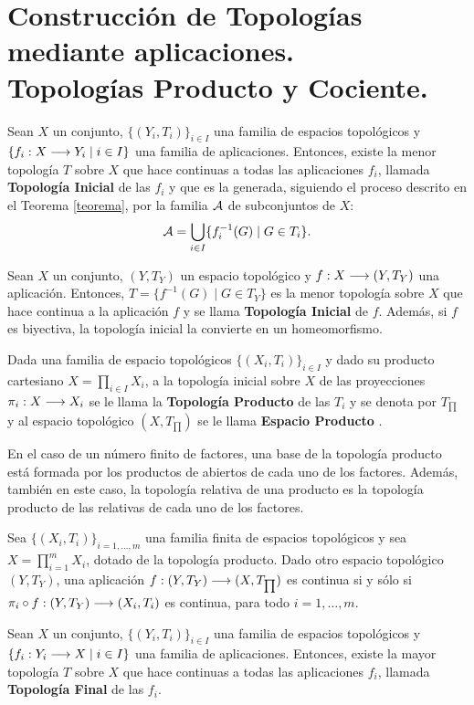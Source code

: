 \documentclass[cursovd_portada.tex]{subfiles}
\begin{document}
\section{Construcción de Topologías mediante aplicaciones.\\ Topologías Producto y Cociente.}
\begin{prop}
Sean $X$ un conjunto, $\{(Y_i,T_i)\}_{i\in I}$ una familia de espacios topológicos y $\{f_i:X\longrightarrow Y_i\mid i\in I\}$ una
familia de aplicaciones. Entonces, existe la menor topología $T$ sobre $X$ que hace continuas a todas las
aplicaciones $f_i$, llamada {\bf Topología Inicial} de las $f_i$ y que es la generada, siguiendo el proceso
descrito en el Teorema \ref{teorema}, por la familia ${\cal A}$ de subconjuntos de $X$:
$${\cal A}=\bigcup_{i\in I}\{f_i^{-1}(G)\mid G\in T_i\}.$$
\end{prop}
\begin{coro}
Sean $X$ un conjunto, $(Y,T_Y)$ un espacio topológico y $f:X\longrightarrow (Y,T_Y)$ una aplicación. Entonces,
$T=\{f^{-1}(G)\mid G\in T_Y\}$ es la menor topología sobre $X$ que hace continua a la aplicación $f$ y se llama {\bf
Topología Inicial} de $f$. Además, si $f$ es biyectiva, la topología inicial la convierte en un homeomorfismo.
\end{coro}
\begin{defi}
Dada una familia de espacio topológicos $\{(X_i,T_i)\}_{i\in I}$ y dado su producto cartesiano $X=\prod_{i\in
I}X_i$, a la topología inicial sobre $X$ de las proyecciones $\pi_i:X\longrightarrow X_i$ se le llama la {\bf Topología
Producto} de las $T_i$ y se denota por $T_{\prod}$ y al espacio topológico $(X,T_{\prod})$ se le llama {\bf
Espacio Producto} .
\end{defi}
\begin{nota}
{\rm En el caso de un número finito de factores, una base de la topología producto está formada por los productos
de abiertos de cada uno de los factores. Además, también en este caso, la topología relativa de una producto es la
topología producto de las relativas de cada uno de los factores.}
\end{nota}
\begin{prop}
Sea $\{(X_i,T_i)\}_{i=1,\dots ,m}$ una familia finita de espacios to\-po\-ló\-gi\-cos y sea $X=\prod_{i=1}^mX_i$,
dotado de la topología producto. Dado otro espacio topológico $(Y,T_Y)$, una aplicación $f:(Y,T_Y)\longrightarrow
(X,T_{\prod})$ es continua si y sólo si $\pi_i\circ f:(Y,T_Y)\longrightarrow (X_i,T_i)$ es continua, para todo $i=1,\dots ,m$.
\end{prop}
\begin{prop}
Sean $X$ un conjunto, $\{(Y_i,T_i)\}_{i\in I}$ una familia de espacios topológicos y $\{f_i:Y_i\longrightarrow X\mid i\in I\}$ una
familia de aplicaciones. Entonces, existe la mayor topología $T$ sobre $X$ que hace continuas a todas las
aplicaciones $f_i$, llamada {\bf Topología Final} de las $f_i$.
\end{prop}
\end{document}
